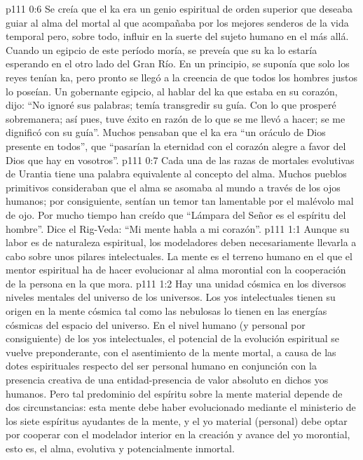 \vs p111 0:6 Se creía que el ka era un genio espiritual de orden superior que deseaba guiar al alma del mortal al que acompañaba por los mejores senderos de la vida temporal pero, sobre todo, influir en la suerte del sujeto humano en el más allá. Cuando un egipcio de este período moría, se preveía que su ka lo estaría esperando en el otro lado del Gran Río. En un principio, se suponía que solo los reyes tenían ka, pero pronto se llegó a la creencia de que todos los hombres justos lo poseían. Un gobernante egipcio, al hablar del ka que estaba en su corazón, dijo: “No ignoré sus palabras; temía transgredir su guía. Con lo que prosperé sobremanera; así pues, tuve éxito en razón de lo que se me llevó a hacer; se me dignificó con su guía”. Muchos pensaban que el ka era “un oráculo de Dios presente en todos”, que “pasarían la eternidad con el corazón alegre a favor del Dios que hay en vosotros”.
\vs p111 0:7 Cada una de las razas de mortales evolutivas de Urantia tiene una palabra equivalente al concepto del alma. Muchos pueblos primitivos consideraban que el alma se asomaba al mundo a través de los ojos humanos; por consiguiente, sentían un temor tan lamentable por el malévolo mal de ojo. Por mucho tiempo han creído que “Lámpara del Señor es el espíritu del hombre”. Dice el Rig\hyp{}Veda: “Mi mente habla a mi corazón”.
\vs p111 1:1 Aunque su labor es de naturaleza espiritual, los modeladores deben necesariamente llevarla a cabo sobre unos pilares intelectuales. La mente es el terreno humano en el que el mentor espiritual ha de hacer evolucionar al alma morontial con la cooperación de la persona en la que mora.
\vs p111 1:2 Hay una unidad cósmica en los diversos niveles mentales del universo de los universos. Los yos intelectuales tienen su origen en la mente cósmica tal como las nebulosas lo tienen en las energías cósmicas del espacio del universo. En el nivel humano (y personal por consiguiente) de los yos intelectuales, el potencial de la evolución espiritual se vuelve preponderante, con el asentimiento de la mente mortal, a causa de las dotes espirituales respecto del ser personal humano en conjunción con la presencia creativa de una entidad\hyp{}presencia de valor absoluto en dichos yos humanos. Pero tal predominio del espíritu sobre la mente material depende de dos circunstancias: esta mente debe haber evolucionado mediante el ministerio de los siete espíritus ayudantes de la mente, y el yo material (personal) debe optar por cooperar con el modelador interior en la creación y avance del yo morontial, esto es, el alma, evolutiva y potencialmente inmortal.
